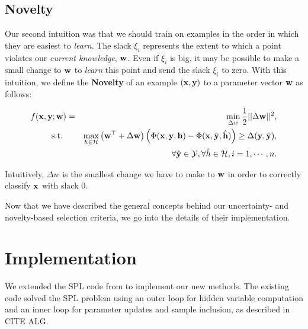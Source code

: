 \documentclass{article}
\newcommand{\mysection}[1]{\vspace{-4mm}\section{#1}\vspace{-4mm}}
\begin{document}
\subsection{Novelty}
Our second intuition was that we should train on examples in the order in which they are easiest to \emph{learn}.  The slack $\xi_i$ represents the extent to which a point violates our \emph{current knowledge}, $\bf w$.  Even if $\xi_i$ is big, it may be possible to make a small change to $\bf w$ to \emph{learn} this point and send the slack $\xi_i$ to zero.  With this intuition, we define the \textbf{Novelty} of an example $(\bf x, \bf y)$ to a parameter vector $\bf w$ as follows:

\begin{eqnarray}
f(\bf x, \bf y; \bf w) &=&\min_{\Delta w} \frac{1}{2}||{\Delta\bf w}||^2, \nonumber \\
\mbox{s.t. } && \max_{h \in {\cal H}} \left( {\bf w}^\top + \Delta\bf w \right) \left(\Phi({\bf x},{\bf y},{\bf h}) - 
		\Phi({\bf x},\hat{\bf y},\hat{\bf h}) \right)
	 \geq \Delta({\bf y},\hat{\bf y}) , \nonumber \\
\label{eq:novelty}
&&\forall \hat{\bf y} \in {\cal Y}, \forall \hat{h} \in {\cal H}, i=1,\cdots,n.
\end{eqnarray}

Intuitively, $\Delta w$ is the smallest change we have to make to $\bf w$ in order to correctly classify $\bf x$ with slack 0.  

Now that we have described the general concepts behind our uncertainty- and novelty-based selection criteria, we go into the details of their implementation.



\mysection{Implementation}
\label{sec:Implementation}

We extended the SPL code from \cite{SPL} to implement our new methods. The existing code solved the SPL problem using an outer loop for hidden variable computation and an inner loop for parameter updates and sample inclusion, as described in CITE ALG.
\end{document}
